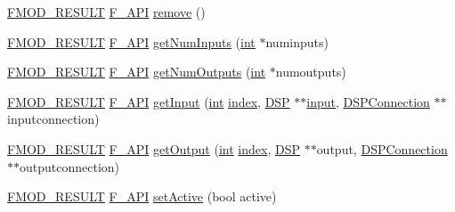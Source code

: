 \begin{DoxyCompactItemize}
\item 
\hyperlink{fmod_8h_ae6ddadf8cb315e93ae7e6456b19db276}{F\-M\-O\-D\-\_\-\-R\-E\-S\-U\-L\-T} \hyperlink{fmod_8h_ace803d13e798b0cdde4384f9f323b901}{F\-\_\-\-A\-P\-I} \hyperlink{class_f_m_o_d_1_1_d_s_p_ae7503115a44e52310e9a7cfe4063cd81}{remove} ()
\item 
\hyperlink{fmod_8h_ae6ddadf8cb315e93ae7e6456b19db276}{F\-M\-O\-D\-\_\-\-R\-E\-S\-U\-L\-T} \hyperlink{fmod_8h_ace803d13e798b0cdde4384f9f323b901}{F\-\_\-\-A\-P\-I} \hyperlink{class_f_m_o_d_1_1_d_s_p_a20667543975afbb53cc19a1389bfd6e7}{get\-Num\-Inputs} (\hyperlink{wglew_8h_a500a82aecba06f4550f6849b8099ca21}{int} $\ast$numinputs)
\item 
\hyperlink{fmod_8h_ae6ddadf8cb315e93ae7e6456b19db276}{F\-M\-O\-D\-\_\-\-R\-E\-S\-U\-L\-T} \hyperlink{fmod_8h_ace803d13e798b0cdde4384f9f323b901}{F\-\_\-\-A\-P\-I} \hyperlink{class_f_m_o_d_1_1_d_s_p_a26bcf3c3560fae9e15db4ea1a39d21e3}{get\-Num\-Outputs} (\hyperlink{wglew_8h_a500a82aecba06f4550f6849b8099ca21}{int} $\ast$numoutputs)
\item 
\hyperlink{fmod_8h_ae6ddadf8cb315e93ae7e6456b19db276}{F\-M\-O\-D\-\_\-\-R\-E\-S\-U\-L\-T} \hyperlink{fmod_8h_ace803d13e798b0cdde4384f9f323b901}{F\-\_\-\-A\-P\-I} \hyperlink{class_f_m_o_d_1_1_d_s_p_adebf041723376a94c176edf0126c8321}{get\-Input} (\hyperlink{wglew_8h_a500a82aecba06f4550f6849b8099ca21}{int} \hyperlink{fmod__codec_8h_a57f14e05b1900f16a2da82ade47d0c6d}{index}, \hyperlink{class_f_m_o_d_1_1_d_s_p}{D\-S\-P} $\ast$$\ast$\hyperlink{glew_8h_ad3c78daa7d8673f71649d4840c641779}{input}, \hyperlink{class_f_m_o_d_1_1_d_s_p_connection}{D\-S\-P\-Connection} $\ast$$\ast$inputconnection)
\item 
\hyperlink{fmod_8h_ae6ddadf8cb315e93ae7e6456b19db276}{F\-M\-O\-D\-\_\-\-R\-E\-S\-U\-L\-T} \hyperlink{fmod_8h_ace803d13e798b0cdde4384f9f323b901}{F\-\_\-\-A\-P\-I} \hyperlink{class_f_m_o_d_1_1_d_s_p_a13584fc2ef78192b375ca6d117a49560}{get\-Output} (\hyperlink{wglew_8h_a500a82aecba06f4550f6849b8099ca21}{int} \hyperlink{fmod__codec_8h_a57f14e05b1900f16a2da82ade47d0c6d}{index}, \hyperlink{class_f_m_o_d_1_1_d_s_p}{D\-S\-P} $\ast$$\ast$output, \hyperlink{class_f_m_o_d_1_1_d_s_p_connection}{D\-S\-P\-Connection} $\ast$$\ast$outputconnection)
\item 
\hyperlink{fmod_8h_ae6ddadf8cb315e93ae7e6456b19db276}{F\-M\-O\-D\-\_\-\-R\-E\-S\-U\-L\-T} \hyperlink{fmod_8h_ace803d13e798b0cdde4384f9f323b901}{F\-\_\-\-A\-P\-I} \hyperlink{class_f_m_o_d_1_1_d_s_p_ab85ee53bebfd6fc3cccb9979cf13eaba}{set\-Active} (bool active)
\item 

\end{DoxyCompactItemize}
